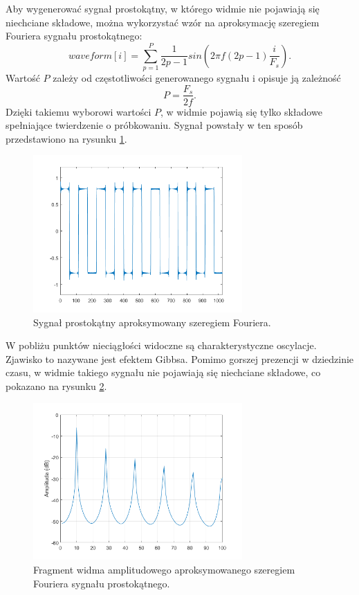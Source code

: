 Aby wygenerować sygnał prostokątny, w którego widmie nie pojawiają się niechciane składowe, można wykorzystać wzór na aproksymację szeregiem Fouriera sygnału prostokątnego:
\begin{equation} \label{equ:sub_gibbs}
waveform[i] = \sum_{p=1}^{P}\frac{1}{2p-1}sin(2\pi f(2p-1)  \frac{i}{F_s}).
\end{equation}
Wartość $P$ zależy od częstotliwości generowanego sygnału i opisuje ją zależność 
\begin{equation} \label{equ:sub_gibbs2}
P = \frac{F_s}{2f}.
\end{equation}
Dzięki takiemu wyborowi wartości $P$, w widmie pojawią się tylko składowe spełniające twierdzenie o próbkowaniu. Sygnał powstały w ten sposób przedstawiono na rysunku \ref{rys:sub_gibbs2}.
 \begin{figure}[H]
 	\centering
 	\includegraphics[width=8cm]{grafiki/sub_gibbs2}
 	\captionsetup{justification=centering}
 	\caption{Sygnał prostokątny aproksymowany szeregiem Fouriera.}
 	\label{rys:sub_gibbs2}
 \end{figure}

W pobliżu punktów nieciągłości widoczne są charakterystyczne oscylacje. Zjawisko to nazywane jest efektem Gibbsa. Pomimo gorszej prezencji w dziedzinie czasu, w widmie takiego sygnału nie pojawiają się niechciane składowe, co pokazano na rysunku \ref{rys:sub_gibbs3}.
\begin{figure}[H]
	\centering
	\includegraphics[width=8cm]{grafiki/sub_gibbs3}
	\captionsetup{justification=centering}
	\caption{Fragment widma amplitudowego aproksymowanego szeregiem Fouriera sygnału prostokątnego.}
	\label{rys:sub_gibbs3}
\end{figure}

